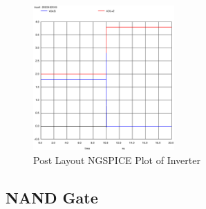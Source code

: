 \documentclass[conference]{IEEEtran}
\begin{document}
\begin{figure}[H]
    \centering
    \includegraphics[width=0.48\textwidth]{images/inv_cmos_post_tran.eps}
    \caption{Post Layout NGSPICE Plot of Inverter}
\end{figure}

\subsection{NAND Gate}
\end{document}
